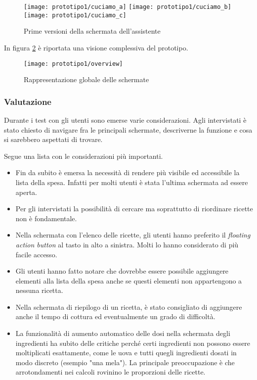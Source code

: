 \clearpage
\begin{figure}[ht]
  \begin{center}
    \texttt{[image: prototipo1/cuciamo\_a]}
    \texttt{[image: prototipo1/cuciamo\_b]}
    \texttt{[image: prototipo1/cuciamo\_c]}
    \caption{Prime versioni della schermata dell'assistente}
    \label{fig:p1_cuciniamo}
  \end{center}
\end{figure}

\clearpage
In figura \ref{fig:p1_overview} è riportata una visione complessiva del prototipo.

\begin{figure}[h]
  \begin{center}
    \texttt{[image: prototipo1/overview]}
    \caption{Rappresentazione globale delle schermate}
    \label{fig:p1_overview}
  \end{center}
\end{figure}

\subsubsection{Valutazione}
Durante i test con gli utenti sono emerse varie considerazioni.
Agli intervistati è stato chiesto di navigare fra le principali schermate, descriverne la funzione e cosa si sarebbero aspettati di trovare.

Segue una lista con le considerazioni più importanti.
\begin{itemize}
  \item Fin da subito è emersa la necessità di rendere più visibile ed accessibile la lista della spesa.
    Infatti per molti utenti è stata l'ultima schermata ad essere aperta.

  \item Per gli intervistati la possibilità di cercare ma soprattutto di riordinare ricette non è fondamentale.

\item Nella schermata con l'elenco delle ricette, gli utenti hanno preferito il \textit{floating action button} al tasto in alto a sinistra.
  Molti lo hanno considerato di più facile accesso.

  \item Gli utenti hanno fatto notare che dovrebbe essere possibile aggiungere elementi alla lista della spesa anche se questi elementi non appartengono a nessuna ricetta.

  \item Nella schermata di riepilogo di un ricetta, è stato consigliato di aggiungere anche il tempo di cottura ed eventualmente un grado di difficoltà.

  \item La funzionalità di aumento automatico delle dosi nella schermata degli ingredienti ha subito delle critiche perché certi ingredienti non possono essere moltiplicati esattamente, come le uova e tutti quegli ingredienti dosati in modo discreto (esempio "una mela").
    La principale preoccupazione è che arrotondamenti nei calcoli rovinino le proporzioni delle ricette.
\end{itemize}

